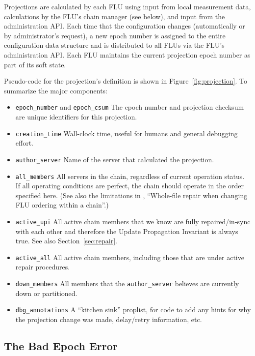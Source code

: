 \documentclass[preprint,10pt]{sigplanconf}
\begin{document}
Projections are calculated by each FLU using input from local
measurement data, calculations by the FLU's chain manager
(see below), and input from the administration API.
Each time that the configuration changes (automatically or by
administrator's request), a new epoch number is assigned
to the entire configuration data structure and is distributed to
all FLUs via the FLU's administration API.  Each FLU maintains the
current projection epoch number as part of its soft state.

Pseudo-code for the projection's definition is shown in
Figure~\ref{fig:projection}.  To summarize the major components:

\begin{itemize}
\item {\tt epoch\_number} and {\tt epoch\_csum} The epoch number and
  projection checksum are unique identifiers for this projection.
\item {\tt creation\_time} Wall-clock time, useful for humans and
  general debugging effort.
\item {\tt author\_server} Name of the server that calculated the projection.
\item {\tt all\_members} All servers in the chain, regardless of current
  operation status.  If all operating conditions are perfect, the
  chain should operate in the order specified here.
  (See also the limitations in \cite{machi-chain-manager-design},
  ``Whole-file repair when changing FLU ordering within a chain''.)
\item {\tt active\_upi} All active chain members that we know are
  fully repaired/in-sync with each other and therefore the Update
  Propagation Invariant \cite{machi-chain-manager-design} is always true.
  See also Section~\ref{sec:repair}.
\item {\tt active\_all} All active chain members, including those that
  are under active repair procedures.
\item {\tt down\_members} All members that the {\tt author\_server}
  believes are currently down or partitioned.
\item {\tt dbg\_annotations} A ``kitchen sink'' proplist, for code to
  add any hints for why the projection change was made, delay/retry
  information, etc.
\end{itemize}

\subsection{The Bad Epoch Error}
\label{sub:bad-epoch}
\end{document}
